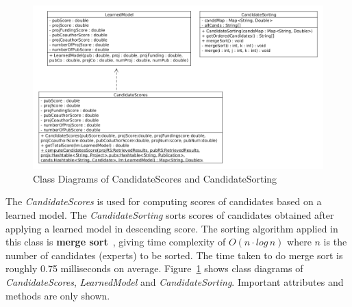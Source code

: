 \begin{figure}
\centering
\includegraphics[scale=0.3]{./figures/score&sorting.png}
\caption{Class Diagrams of CandidateScores and CandidateSorting} \label{fig:scoreandsorting} 
\end{figure}

The \textit{CandidateScores} is used for computing scores of candidates based on a learned model. The \textit{CandidateSorting}
sorts scores of candidates obtained after applying a learned model in descending score.
The sorting algorithm applied in this class is \textbf{merge sort}~\cite{mergesort}, giving time complexity of $O(n\cdot log\, n)$ where $n$ is the 
number of candidates (experts) to be sorted. The time taken to do merge sort is roughly 0.75 milliseconds on average.
Figure~\ref{fig:scoreandsorting} shows class diagrams of \textit{CandidateScores}, \textit{LearnedModel} and \textit{CandidateSorting}.
Important attributes and methods are only shown.

